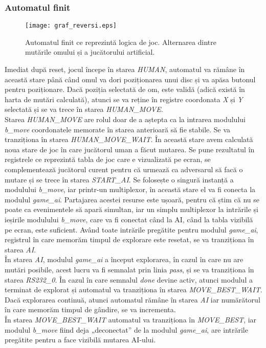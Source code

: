 \documentclass[12pt,twoside,a4paper,fleqn]{book}
\theoremstyle{definition}
\begin{document}
\subsubsection{Automatul finit}
\begin{figure}[h]
\texttt{[image: graf\_reversi.eps]}
\caption{\small{Automatul finit ce reprezintă logica de joc. Alternarea dintre mutările omului și a jucătorului artificial.}}
\label{fig:fig_aut2}
\end{figure}
Imediat după reset, jocul începe în starea \emph{HUMAN}, automatul va rămâne în această stare până când omul va dori poziționarea unui disc și va apăsa butonul pentru poziționare. Dacă poziția selectată de om, este validă (adică există în harta de mutări calculată), atunci se va reține în registre coordonata \emph{X} și \emph{Y} selectată și se va trece în starea \emph{HUMAN\_MOVE}.\\
Starea \emph{HUMAN\_MOVE} are rolul doar de a aștepta ca la intrarea modulului \emph{b\_move} coordonatele memorate în starea anterioară să fie stabile. Se va tranziționa în starea \emph{HUMAN\_MOVE\_WAIT}. În această stare avem calculată noua stare de joc în care jucătorul uman a făcut mutarea. Se pune rezultatul în registrele ce reprezintă tabla de joc care e vizualizată pe ecran, se complementează jucătorul curent pentru că urmează ca adversarul să facă o mutare și se trece în starea \emph{START\_AI}. Se folosește o singură instanță a modulului \emph{b\_move}, iar printr-un multiplexor, în această stare el va fi conecta la modulul \emph{game\_ai}. Partajarea acestei resurse este ușoară, pentru că știm că nu se poate ca evenimentele să apară simultan, iar un simplu multiplexor la intrările și ieșirile modulului \emph{b\_move}, care va fi conectat când la AI, când la tabla vizibilă pe ecran, este suficient. Având toate intrările pregătite pentru modulul \emph{game\_ai}, registrul în care memorăm timpul de explorare este resetat, se va tranziționa în starea \emph{AI}.\\
În starea \emph{AI}, modulul \emph{game\_ai} a început explorarea, în cazul în care nu are mutări posibile, acest lucru va fi semnalat prin linia \emph{pass}, și se va tranziționa în starea \emph{RS232\_0}. În cazul în care semnalul \emph{done} devine activ, atunci modulul a terminat de explorat și automatul va tranziționa în starea \emph{MOVE\_BEST\_WAIT}. Dacă explorarea continuă, atunci automatul rămâne în starea \emph{AI} iar numărătorul în care memorăm timpul de gândire, se va incrementa.\\
În starea \emph{MOVE\_BEST\_WAIT} automatul va tranziționa în \emph{MOVE\_BEST}, iar modulul \emph{b\_move} fiind deja „deconectat” de la modulul \emph{game\_ai}, are intrările pregătite pentru a face vizibilă mutarea AI-ului.\\
\end{document}
